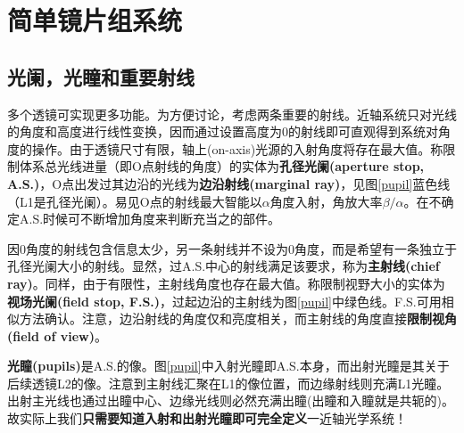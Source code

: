 \documentclass[12pt]{ctexart}%
\begin{document}
\section*{简单镜片组系统}
\subsection*{光阑，光瞳和重要射线}
多个透镜可实现更多功能。为方便讨论，考虑两条重要的射线。近轴系统只对光线的角度和高度进行线性变换，因而通过设置高度为0的射线即可直观得到系统对角度的操作。由于透镜尺寸有限，轴上(on-axis)光源的入射角度将存在最大值。称限制体系总光线进量（即O点射线的角度）的实体为\textbf{孔径光阑(aperture stop, A.S.)}，O点出发过其边沿的光线为\textbf{边沿射线(marginal ray)}，见图\ref{pupil}蓝色线（L1是孔径光阑）。易见O点的射线最大智能以$\alpha$角度入射，角放大率$\beta/\alpha$。在不确定A.S.时候可不断增加角度来判断充当之的部件。
\par 因0角度的射线包含信息太少，另一条射线并不设为0角度，而是希望有一条独立于孔径光阑大小的射线。显然，过A.S.中心的射线满足该要求，称为\textbf{主射线(chief ray)}。同样，由于有限性，主射线角度也存在最大值。称限制视野大小的实体为\textbf{视场光阑(field stop, F.S.)}，过起边沿的主射线为图\ref{pupil}中绿色线。F.S.可用相似方法确认。注意，边沿射线的角度仅和亮度相关，而主射线的角度直接\textbf{限制视角(field of view)}。
\par \textbf{光瞳(pupils)}是A.S.的像。图\ref{pupil}中入射光瞳即A.S.本身，而出射光瞳是其关于后续透镜L2的像。注意到主射线汇聚在L1的像位置，而边缘射线则充满L1光瞳。出射主光线也通过出瞳中心、边缘光线则必然充满出瞳(出瞳和入瞳就是共轭的)。故实际上我们\textbf{只需要知道入射和出射光瞳即可完全定义}一近轴光学系统！
\end{document}
